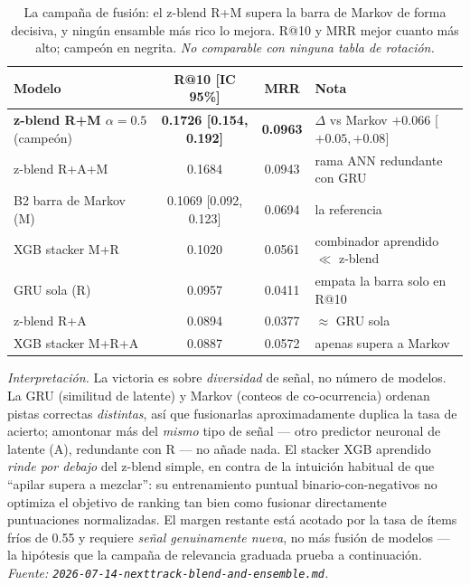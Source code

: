\documentclass[11pt]{article}
\newcommand{\best}[1]{\textbf{#1}}
\begin{document}
\begin{table}[ht]
  \centering
  \caption{La campaña de fusión: el z-blend R+M supera la barra de Markov de forma
  decisiva, y ningún ensamble más rico lo mejora. R@10 y MRR mejor cuanto más alto;
  campeón en negrita. \emph{No comparable con ninguna tabla de rotación.}}
  \label{tab:nexttrack-blend}
  {\small\setlength{\tabcolsep}{5pt}\begin{tabular}{lccl}
    \toprule
    Modelo & R@10 [IC 95\%] & MRR & Nota \\
    \midrule
    \best{z-blend R+M $\alpha{=}0.5$} (campeón) & \best{0.1726 [0.154, 0.192]} & \best{0.0963} & $\Delta$ vs Markov $+0.066$ [$+0.05,+0.08$] \\
    z-blend R+A+M                                & 0.1684 & 0.0943 & rama ANN redundante con GRU \\
    B2 barra de Markov (M)                       & 0.1069 [0.092, 0.123] & 0.0694 & la referencia \\
    XGB stacker M+R                              & 0.1020 & 0.0561 & combinador aprendido $\ll$ z-blend \\
    GRU sola (R)                                 & 0.0957 & 0.0411 & empata la barra solo en R@10 \\
    z-blend R+A                                  & 0.0894 & 0.0377 & $\approx$ GRU sola \\
    XGB stacker M+R+A                            & 0.0887 & 0.0572 & apenas supera a Markov \\
    \bottomrule
  \end{tabular}}
\end{table}

\emph{Interpretación.} La victoria es sobre \emph{diversidad} de señal, no número
de modelos. La GRU (similitud de latente) y Markov (conteos de co-ocurrencia)
ordenan pistas correctas \emph{distintas}, así que fusionarlas aproximadamente
duplica la tasa de acierto; amontonar más del \emph{mismo} tipo de señal --- otro
predictor neuronal de latente (A), redundante con R --- no añade nada. El stacker
XGB aprendido \emph{rinde por debajo} del z-blend simple, en contra de la intuición
habitual de que ``apilar supera a mezclar'': su entrenamiento puntual
binario-con-negativos no optimiza el objetivo de ranking tan bien como fusionar
directamente puntuaciones normalizadas. El margen restante está acotado por la tasa
de ítems fríos de \num{0.55} y requiere \emph{señal genuinamente nueva}, no más
fusión de modelos --- la hipótesis que la campaña de relevancia graduada prueba a
continuación.
\emph{Fuente: \texttt{2026-07-14-nexttrack-blend-and-ensemble.md}.}
\end{document}
